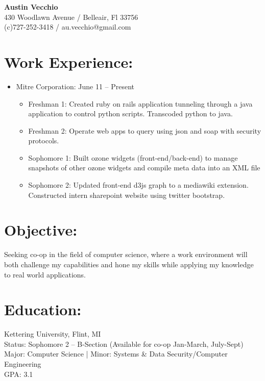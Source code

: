 \documentclass{res}
\begin{document}
\begin{center}
\LARGE{\textbf{Austin Vecchio}}\\
\normalsize{
430 Woodlawn Avenue / Belleair, Fl 33756\\
(c)727-252-3418 / au.vecchio@gmail.com
}
\end{center}

\section{Work Experience:}
\begin{itemize}
\item Mitre Corporation: \hspace{45pt} June 11 – Present
\begin{itemize}[label=$\circ$]
\item Freshman 1: Created ruby on rails application tunneling through a java application to control python scripts. Transcoded python to java.
\item Freshman 2: Operate web apps to query using json and soap with security protocols.
\item Sophomore 1: Built ozone widgets (front-end/back-end) to manage snapshots of other ozone widgets and compile meta data into an XML file
\item Sophomore 2: Updated front-end d3js graph to a mediawiki extension. Constructed intern sharepoint website using twitter bootstrap.
\end{itemize}
\end{itemize}

\section{Objective:}
Seeking co-op in the field of computer science, where a work environment will both challenge my capabilities and hone my skills while applying my knowledge to real world applications.\\

\section{Education:}
Kettering University, Flint, MI\\
Status: Sophomore 2 – B-Section (Available for co-op Jan-March, July-Sept)\\
Major: Computer Science %
|   Minor: Systems \& Data Security/Computer Engineering\\
GPA: 3.1
\end{document}
